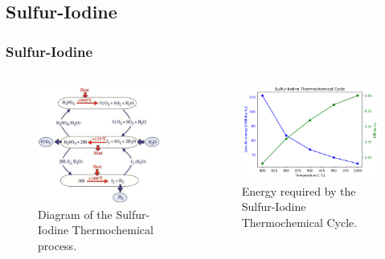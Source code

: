 \subsection{Sulfur-Iodine}
\begin{frame}
\frametitle{Sulfur-Iodine}
\begin{columns}
    \column[t]{5cm}
  	\begin{figure}[htbp!]
		\begin{center}
			\includegraphics[width=5cm]{images/sulfur1.png}
		\end{center}
		\caption{Diagram of the Sulfur-Iodine Thermochemical process.}
 	\end{figure}

 	\column[t]{5cm}
   	\begin{figure}[htbp!]
		\begin{center}
			\includegraphics[width=4.8cm]{images/si-energy2.png}
		\end{center}
		\caption{Energy required by the Sulfur-Iodine Thermochemical Cycle.}
 	\end{figure}
\end{columns}
\end{frame}

